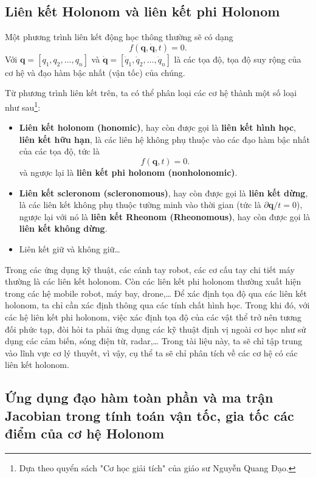 \subsection{Liên kết Holonom và liên kết phi Holonom}

Một phương trình liên kết động học thông thường sẽ có dạng
\begin{equation}
    f(\mathbf{q}, \mathbf{\dot{q}}, t) = 0.
\end{equation}
Với $\mathbf{q} = [q_1,q_2,\ldots,q_n]$ và $\mathbf{\dot{q}} = [\dot{q}_1,\dot{q}_2,\ldots,\dot{q}_n]$ là các tọa độ, tọa độ suy rộng của cơ hệ và đạo hàm bậc nhất (vận tốc) của chúng.

Từ phương trình liên kết trên, ta có thể phân loại các cơ hệ thành một số loại như sau\footnote{Dựa theo quyển sách "Cơ học giải tích" của giáo sư Nguyễn Quang Đạo.}:
\begin{itemize}
    \item \textbf{Liên kết holonom (honomic)}, hay còn được gọi là \textbf{liên kết hình học}, \textbf{liên kết hữu hạn}, là các liên hệ không phụ thuộc vào các đạo hàm bậc nhất của các tọa độ, tức là
    \begin{equation*}
        f(\mathbf{q}, t) = 0.
    \end{equation*}
    và ngược lại là \textbf{ liên kết phi holonom (nonholonomic)}.
    \item \textbf{Liên kết scleronom (scleronomous)}, hay còn được gọi là \textbf{liên kết dừng}, là các liên kết không phụ thuộc tường minh vào thời gian (tức là $\partial \mathbf{q} / t = 0$), ngược lại với nó là \textbf{liên kết Rheonom (Rheonomous)}, hay còn được gọi là \textbf{liên kết không dừng}.
    \item Liên kết giữ và không giữ\ldots %
\end{itemize}
Trong các ứng dụng kỹ thuật, các cánh tay robot, các cơ cấu tay chi tiết máy thường là các liên kết holonom. 
Còn các liên kết phi holonom thường xuất hiện trong các hệ mobile robot, máy bay, drone,\ldots 
Để xác định tọa độ qua các liên kết holonom, ta chỉ cần xác định thông qua các tính chất hình học. 
Trong khi đó, với các hệ liên kết phi holonom, việc xác định tọa độ của các vật thể trở nên tương đối phức tạp, đòi hỏi ta phải ứng dụng các kỹ thuật định vị ngoài cơ học như sử dụng các cảm biến, sóng điện từ, radar,\ldots 
Trong tài liệu này, ta sẽ chỉ tập trung vào lĩnh vực cơ lý thuyết, vì vậy, cụ thể ta sẽ chỉ phân tích về các cơ hệ có các liên kết holonom.

\subsection{Ứng dụng đạo hàm toàn phần và ma trận Jacobian trong tính toán vận tốc, gia tốc các điểm của cơ hệ Holonom}

